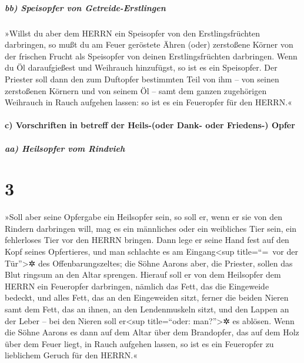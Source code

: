 \hypertarget{bb-speisopfer-von-getreide-erstlingen}{%
\subparagraph{bb) Speisopfer von
Getreide-Erstlingen}\label{bb-speisopfer-von-getreide-erstlingen}}

»Willst du aber dem HERRN ein Speisopfer von den
Erstlingsfrüchten darbringen, so mußt du am Feuer geröstete Ähren (oder)
zerstoßene Körner von der frischen Frucht als Speisopfer von deinen
Erstlingsfrüchten darbringen. Wenn du Öl daraufgießest
und Weihrauch hinzufügst, so ist es ein Speisopfer. Der
Priester soll dann den zum Duftopfer bestimmten Teil von ihm -- von
seinen zerstoßenen Körnern und von seinem Öl -- samt dem ganzen
zugehörigen Weihrauch in Rauch aufgehen lassen: so ist es ein Feueropfer
für den HERRN.«

\hypertarget{c-vorschriften-in-betreff-der-heils-oder-dank--oder-friedens--opfer}{%
\paragraph{c) Vorschriften in betreff der Heils-(oder Dank- oder
Friedens-)
Opfer}\label{c-vorschriften-in-betreff-der-heils-oder-dank--oder-friedens--opfer}}

\hypertarget{aa-heilsopfer-vom-rindvieh}{%
\subparagraph{aa) Heilsopfer vom
Rindvieh}\label{aa-heilsopfer-vom-rindvieh}}

\hypertarget{section-2}{%
\section{3}\label{section-2}}

»Soll aber seine Opfergabe ein Heilsopfer sein, so soll
er, wenn er sie von den Rindern darbringen will, mag es ein männliches
oder ein weibliches Tier sein, ein fehlerloses Tier vor den HERRN
bringen. Dann lege er seine Hand fest auf den Kopf seines
Opfertieres, und man schlachte es am Eingang\textless sup title=``=~vor
der Tür''\textgreater✲ des Offenbarungszeltes; die Söhne Aarons aber,
die Priester, sollen das Blut ringsum an den Altar sprengen.
Hierauf soll er von dem Heilsopfer dem HERRN ein
Feueropfer darbringen, nämlich das Fett, das die Eingeweide bedeckt, und
alles Fett, das an den Eingeweiden sitzt, ferner die
beiden Nieren samt dem Fett, das an ihnen, an den Lendenmuskeln sitzt,
und den Lappen an der Leber -- bei den Nieren soll er\textless sup
title=``oder: man?''\textgreater✲ es ablösen. Wenn die
Söhne Aarons es dann auf dem Altar über dem Brandopfer, das auf dem Holz
über dem Feuer liegt, in Rauch aufgehen lassen, so ist es ein Feueropfer
zu lieblichem Geruch für den HERRN.«

